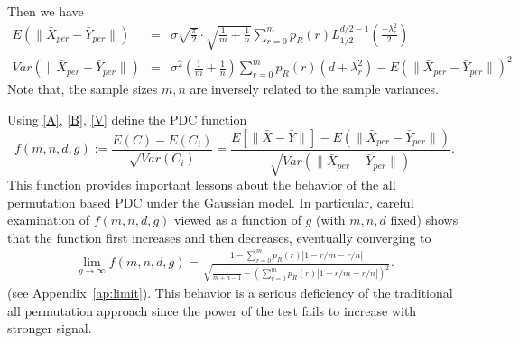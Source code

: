 \documentclass[12pt]{article}
\begin{document}
{%
Then we have
\begin{eqnarray}
\label{B}
E(\|\bar X_{per}-\bar Y_{per}\|)&=&\sigma \sqrt{\frac{\pi}{2}}\cdot\sqrt{\frac{1}{m}+\frac{1}{n}}\sum_{r=0}^mp_R(r)  L_{1/2}^{d/2-1}(\frac{-\lambda_r^2}{2})\\
\label{V}
Var(\|\bar X_{per}-\bar Y_{per}\|)&=& \sigma^2 (\frac{1}{m}+\frac{1}{n})\sum_{r=0}^mp_R(r) (d+\lambda_r^2)- E(\|\bar X_{per}-\bar Y_{per}\|)^2
\end{eqnarray}
Note that, the sample sizes $m, n$ are inversely related to the sample variances. %

Using \eqref{A}, \eqref{B}, \eqref{V} define the PDC function
\begin{equation}\label{eq:PDCexpF}
f(m, n, d, g) := \frac{E(C)-E(C_i)}{\sqrt{Var(C_i)}}=\frac{E[\|\bar X-\bar Y\|]-E(\|\bar X_{per}-\bar Y_{per}\|)}{\sqrt{Var(\|\bar X_{per}-\bar Y_{per}\|)}}.
\end{equation}
This function provides important lessons about the behavior of the all permutation based PDC under the Gaussian model.
In particular, careful examination of $f(m, n, d, g)$ viewed as a function of $g$ (with $m,n,d$ fixed) shows that the function first increases and then decreases, eventually converging to
\begin{eqnarray}
\label{f}
\lim_{g\to \infty}f(m, n, d, g)=\frac{1-\sum_{r=0}^m  p_R(r)  |1-r/m-r/n|}{\sqrt{\frac{1}{m+n-1}-(\sum_{r=0}^m  p_R(r)  |1-r/m-r/n|)^2}}.
\end{eqnarray}
(see Appendix~\ref{ap:limit}). This behavior is a serious deficiency of the traditional all permutation approach since the power of the test fails to increase with stronger signal.
}
\end{document}
